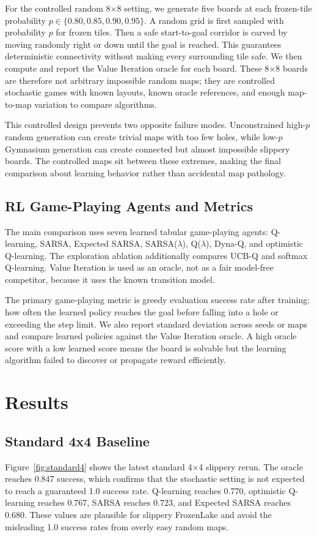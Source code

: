 \documentclass[10pt]{article}
\begin{document}
For the controlled random 8$\times$8 setting, we generate five boards at each frozen-tile probability $p\in\{0.80,0.85,0.90,0.95\}$. A random grid is first sampled with probability $p$ for frozen tiles. Then a safe start-to-goal corridor is carved by moving randomly right or down until the goal is reached. This guarantees deterministic connectivity without making every surrounding tile safe. We then compute and report the Value Iteration oracle for each board. These 8$\times$8 boards are therefore not arbitrary impossible random maps; they are controlled stochastic games with known layouts, known oracle references, and enough map-to-map variation to compare algorithms.

This controlled design prevents two opposite failure modes. Unconstrained high-$p$ random generation can create trivial maps with too few holes, while low-$p$ Gymnasium generation can create connected but almost impossible slippery boards. The controlled maps sit between these extremes, making the final comparison about learning behavior rather than accidental map pathology.

\subsection{RL Game-Playing Agents and Metrics}
The main comparison uses seven learned tabular game-playing agents: Q-learning, SARSA, Expected SARSA, SARSA($\lambda$), Q($\lambda$), Dyna-Q, and optimistic Q-learning. The exploration ablation additionally compares UCB-Q and softmax Q-learning. Value Iteration is used as an oracle, not as a fair model-free competitor, because it uses the known transition model.

The primary game-playing metric is greedy evaluation success rate after training: how often the learned policy reaches the goal before falling into a hole or exceeding the step limit. We also report standard deviation across seeds or maps and compare learned policies against the Value Iteration oracle. A high oracle score with a low learned score means the board is solvable but the learning algorithm failed to discover or propagate reward efficiently.

\section{Results}
\subsection{Standard 4x4 Baseline}
Figure~\ref{fig:standard4} shows the latest standard 4$\times$4 slippery rerun. The oracle reaches 0.847 success, which confirms that the stochastic setting is not expected to reach a guaranteed 1.0 success rate. Q-learning reaches 0.770, optimistic Q-learning reaches 0.767, SARSA reaches 0.723, and Expected SARSA reaches 0.680. These values are plausible for slippery FrozenLake and avoid the misleading 1.0 success rates from overly easy random maps.
\end{document}
